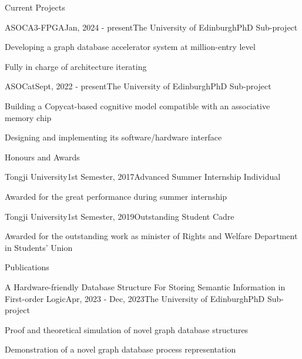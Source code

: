\documentclass{resume} %
\begin{document}
\begin{rSection}{Current Projects}
	
	\begin{rSubsection}{ASOCA3-FPGA}{Jan, 2024 - present}{The University of Edinburgh}{PhD Sub-project}
		\item Developing a graph database accelerator system at million-entry level
		\item Fully in charge of architecture iterating
	\end{rSubsection}
	
	
	\begin{rSubsection}{ASOCat}{Sept, 2022 - present}{The University of Edinburgh}{PhD Sub-project}
		\item Building a Copycat-based cognitive model compatible with an associative memory chip
		\item Designing and implementing its software/hardware interface
	\end{rSubsection}

\end{rSection}

\begin{rSection}{Honours and Awards}
	
	\begin{rSubsection}{Tongji University}{1st Semester, 2017}{Advanced Summer Internship Individual}{}
		\item Awarded for the great performance during summer internship
	\end{rSubsection}
		
	\begin{rSubsection}{Tongji University}{1st Semester, 2019}{Outstanding Student Cadre}{}
		\item Awarded for the outstanding work as minister of Rights and Welfare Department in Students' Union
	\end{rSubsection}

\end{rSection}

\begin{rSection}{Publications}

	\begin{rSubsection}{A Hardware-friendly Database Structure For Storing Semantic Information in First-order Logic}{Apr, 2023 - Dec, 2023}{The University of Edinburgh}{PhD Sub-project}
		\item Proof and theoretical simulation of novel graph database structures
		\item Demonstration of a novel graph database process representation
	\end{rSubsection}
	
\end{rSection}
\end{document}
